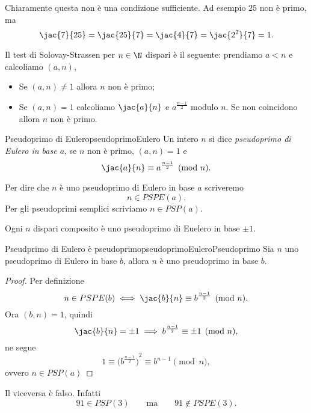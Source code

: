 	\begin{oss}
	Chiaramente questa non è una condizione sufficiente. Ad esempio \(25\) non è primo, ma
		\[
		\jac{7}{25} = \jac{25}{7} = \jac{4}{7} = \jac{2^2}{7} = 1.
		\]
	\end{oss}

	Il test di Solovay-Strassen per \(n\in\N\) dispari è il seguente:
	prendiamo \(a<n\) e calcoliamo \((a,n)\),
	\begin{itemize}
		\item Se \((a,n)\neq 1\) allora \(n\) non è primo;
		\item Se \((a,n)=1\) calcoliamo \(\jac{a}{n}\) e \(a^{\frac{n-1}{2}}\) modulo \(n\). Se non coincidono allora \(n\) non è primo.
	\end{itemize}

	\begin{defn}{Pseudoprimo di Eulero}{pseudoprimoEulero}
	Un intero \(n\) si dice \emph{pseudoprimo di Eulero in base \(a\)}, se \(n\) non è primo, \((a,n)=1\) e 
		\[
		\jac{a}{n} \equiv a^{\frac{n-1}{2}} \pmod{n}.
		\]
	\end{defn}

	\begin{notz}
	Per dire che \(n\) è uno pseudoprimo di Eulero in base \(a\) scriveremo
		\[
		n\in PSPE(a).
		\]
	Per gli pseudoprimi semplici scriviamo \(n\in PSP(a)\).
	\end{notz}

	\begin{oss}
	Ogni \(n\) dispari composito è uno pseudoprimo di Euelero in base \(\pm 1\).
	\end{oss}

	\begin{prop}{Pseudprimo di Eulero è pseudoprimo}{pseudoprimoEuleroPseudoprimo}
	Sia \(n\) uno pseudoprimo di Eulero in base \(b\), allora \(n\) è uno pseudoprimo in base \(b\).
	\end{prop}

	\begin{proof}
	Per definizione
		\[
		n\in PSPE(b) \iff \jac{b}{n} \equiv b^{\frac{n-1}{2}} \pmod{n}.
		\]
	Ora \((b,n)=1\), quindi
		\[
		\jac{b}{n} = \pm 1 \implies b^{\frac{n-1}{2}} \equiv \pm 1 \pmod{n},
		\]
	ne segue
		\[
		1 \equiv {\big(b^{\frac{n-1}{2}}\big)}^2 \equiv b^{n-1} \pmod{n},
		\]
	ovvero \(n\in PSP(a)\)
	\end{proof}

	\begin{oss}
	Il viceversa è falso. Infatti 
		\[
		91 \in PSP(3) \qquad\text{ma}\qquad 91 \not\in PSPE(3).
		\]
	\end{oss}

